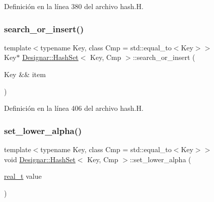 Definición en la línea 380 del archivo hash.\+H.

\mbox{\label{class_designar_1_1_hash_set_a9ecd2f2a1e299cc35e90c66c8357beff}} 
\subsubsection{\texorpdfstring{search\+\_\+or\+\_\+insert()}{search\_or\_insert()}\hspace{0.1cm}{\footnotesize\ttfamily [2/2]}}
{\footnotesize\ttfamily template$<$typename Key, class Cmp = std\+::equal\+\_\+to$<$\+Key$>$$>$ \\
Key$\ast$ \hyperlink{class_designar_1_1_hash_set}{Designar\+::\+Hash\+Set}$<$ Key, Cmp $>$\+::search\+\_\+or\+\_\+insert (\begin{DoxyParamCaption}\item[{Key \&\&}]{item }\end{DoxyParamCaption})\hspace{0.3cm}{\ttfamily [inline]}}



Definición en la línea 406 del archivo hash.\+H.

\mbox{\label{class_designar_1_1_hash_set_a263b1c2f045910e13f49fb4a295fbd27}} 
\subsubsection{\texorpdfstring{set\+\_\+lower\+\_\+alpha()}{set\_lower\_alpha()}}
{\footnotesize\ttfamily template$<$typename Key, class Cmp = std\+::equal\+\_\+to$<$\+Key$>$$>$ \\
void \hyperlink{class_designar_1_1_hash_set}{Designar\+::\+Hash\+Set}$<$ Key, Cmp $>$\+::set\+\_\+lower\+\_\+alpha (\begin{DoxyParamCaption}\item[{\hyperlink{namespace_designar_aca2c32af26808dbec1f3a3071fad25ce}{real\+\_\+t}}]{value }\end{DoxyParamCaption})\hspace{0.3cm}{\ttfamily [inline]}}



